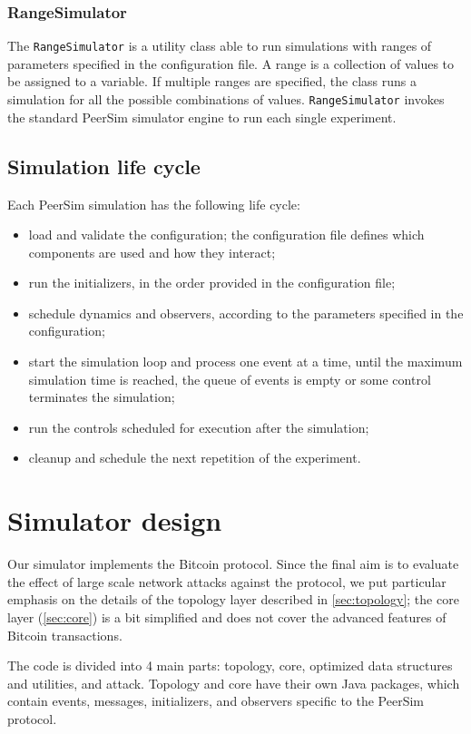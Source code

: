 \subsubsection{RangeSimulator}
The \texttt{RangeSimulator} is a utility class able to run simulations with ranges of parameters specified in the configuration file.
A range is a collection of values to be assigned to a variable.
If multiple ranges are specified, the class runs a simulation for all the possible combinations of values.
\texttt{RangeSimulator} invokes the standard PeerSim simulator engine to run each single experiment.

\subsection{Simulation life cycle}
Each PeerSim simulation has the following life cycle:
\begin{itemize}
	\item load and validate the configuration; the configuration file defines which components are used and how they interact;
	\item run the initializers, in the order provided in the configuration file;
	\item schedule dynamics and observers, according to the parameters specified in the configuration;
	\item start the simulation loop and process one event at a time, until the maximum simulation time is reached, the queue of events is empty or some control terminates the simulation;
	\item run the controls scheduled for execution after the simulation;
	\item cleanup and schedule the next repetition of the experiment.
\end{itemize}


\section{Simulator design}
Our simulator implements the Bitcoin protocol.
Since the final aim is to evaluate the effect of large scale network attacks against the protocol, we put particular emphasis on the details of the topology layer described in \cref{sec:topology};
the core layer (\cref{sec:core}) is a bit simplified and does not cover the advanced features of Bitcoin transactions.

\smallskip
The code is divided into \num{4} main parts: topology, core, optimized data structures and utilities, and attack.
Topology and core have their own Java packages, which contain events, messages, initializers, and observers specific to the PeerSim protocol.

